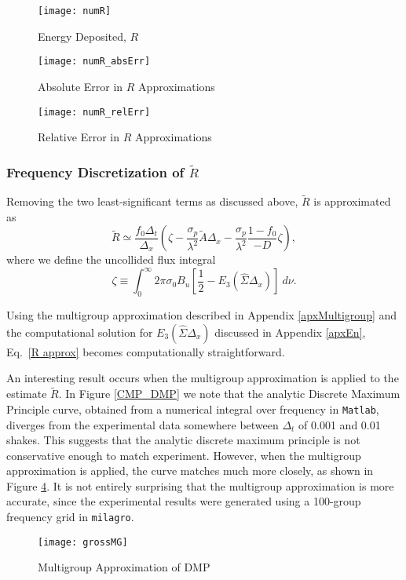 \begin{figure}[H]
\centering
\texttt{[image: numR]}
\caption{Energy Deposited, $R$}
\label{numR}
\end{figure}

\begin{figure}[H]
\centering
\texttt{[image: numR\_absErr]}
\caption{Absolute Error in $R$ Approximations}
\label{numR_absErr}
\end{figure}

\begin{figure}[H]
\centering
\texttt{[image: numR\_relErr]}
\caption{Relative Error in $R$ Approximations}
\label{numR_relErr}
\end{figure}

\subsubsection{Frequency Discretization of $\tilde R$}
Removing the two least-significant terms as discussed above, $\tilde R$ is
approximated as
\begin{equation}
\tilde R\simeq\frac{f_0\Delta_t}{\Delta_x}\left(\zeta -
  \frac{\sigma_p}{\lambda^2}\tilde A\Delta_x - 
  \frac{\sigma_p}{\lambda^2}\frac{1-f_0}{-D}\zeta\right), \label{R approx}
\end{equation}
where we define the uncollided flux integral
\begin{equation}
\zeta\equiv\int_0^\infty 2\pi\sigma_0B_u\left[
  \frac{1}{2}-E_3(\hat\Sigma\Delta_x)\right]\ d\nu. \label{UncollidedFlux}
\end{equation}

Using the multigroup approximation described in Appendix \ref{apxMultigroup}
and the computational solution for $E_3(\hat\Sigma\Delta_x)$ discussed in
Appendix \ref{apxEn}, Eq.\ \eqref{R approx} becomes computationally
straightforward.

An interesting result occurs when the multigroup approximation is applied to
the estimate $\tilde R$.  In Figure \ref{CMP_DMP} we note that the analytic
Discrete Maximum
Principle curve, obtained from a numerical integral over frequency in
\texttt{Matlab}, diverges from the experimental data somewhere between
$\Delta_t$ of 0.001 and 0.01 shakes.  This suggests that the analytic discrete
maximum principle is not conservative enough to match experiment.  However,
when the multigroup approximation is applied, the curve matches much more
closely, as shown in Figure \ref{mg_DMP}.  It is not entirely surprising that
the multigroup approximation is more accurate, since
the experimental results were generated using a 100-group frequency grid in
\texttt{milagro}.
\begin{figure}[htb]
\centering
\texttt{[image: grossMG]}
\caption{Multigroup Approximation of DMP}
\label{mg_DMP}
\end{figure}


